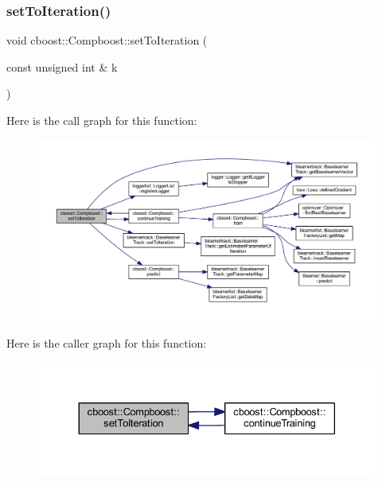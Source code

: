 \subsubsection{\texorpdfstring{set\+To\+Iteration()}{setToIteration()}}
{\footnotesize\ttfamily void cboost\+::\+Compboost\+::set\+To\+Iteration (\begin{DoxyParamCaption}\item[{const unsigned int \&}]{k }\end{DoxyParamCaption})}

Here is the call graph for this function\+:\nopagebreak
\begin{figure}[H]
\begin{center}
\leavevmode
\includegraphics[width=350pt]{classcboost_1_1_compboost_ad1ee3b88f585f38255d827dceb4b7659_cgraph}
\end{center}
\end{figure}
Here is the caller graph for this function\+:\nopagebreak
\begin{figure}[H]
\begin{center}
\leavevmode
\includegraphics[width=330pt]{classcboost_1_1_compboost_ad1ee3b88f585f38255d827dceb4b7659_icgraph}
\end{center}
\end{figure}
\mbox{\label{classcboost_1_1_compboost_a7be8cb767054ece895d535c1f468233e}} 
